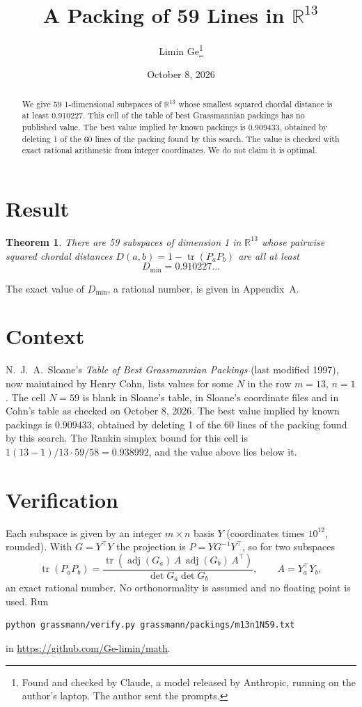 \documentclass[11pt,a4paper]{article}
\title{A Packing of 59 Lines in $\mathbb{R}^{13}$}
\author{Limin Ge\thanks{Found and checked by Claude, a model released by Anthropic, running on the author's laptop. The author sent the prompts.}}
\date{October 8, 2026}
\newtheorem*{theorem}{Theorem}
\begin{document}
\maketitle
\begin{abstract}
We give 59 1-dimensional subspaces of $\mathbb{R}^{13}$ whose smallest squared chordal distance is at least 0.910227. This cell of the table of best Grassmannian packings has no published value. The best value implied by known packings is 0.909433, obtained by deleting 1 of the 60 lines of the packing found by this search. The value is checked with exact rational arithmetic from integer coordinates. We do not claim it is optimal.
\end{abstract}

\section{Result}
\begin{theorem}
There are 59 subspaces of dimension 1 in $\mathbb{R}^{13}$ whose pairwise squared chordal distances $D(a,b) = 1 - \operatorname{tr}(P_aP_b)$ are all at least
\[ D_{\min} = 0.910227\ldots \]
\end{theorem}
The exact value of $D_{\min}$, a rational number, is given in Appendix~A.


\section{Context}
N.~J.~A.~Sloane's \emph{Table of Best Grassmannian Packings} (last modified 1997), now maintained by Henry Cohn, lists values for some $N$ in the row $m=13$, $n=1$. The cell $N=59$ is blank in Sloane's table, in Sloane's coordinate files and in Cohn's table as checked on October 8, 2026. The best value implied by known packings is 0.909433, obtained by deleting 1 of the 60 lines of the packing found by this search. The Rankin simplex bound for this cell is $1(13-1)/13\cdot 59/58 = 0.938992$, and the value above lies below it.


\section{Verification}
Each subspace is given by an integer $m\times n$ basis $Y$ (coordinates times $10^{12}$, rounded). With $G=Y^\top Y$ the projection is $P=YG^{-1}Y^\top$, so for two subspaces
\[ \operatorname{tr}(P_aP_b)=\frac{\operatorname{tr}(\operatorname{adj}(G_a)\,A\,\operatorname{adj}(G_b)\,A^\top)}{\det G_a\det G_b},\qquad A=Y_a^\top Y_b, \]
an exact rational number. No orthonormality is assumed and no floating point is used. Run
\begin{verbatim}
python grassmann/verify.py grassmann/packings/m13n1N59.txt
\end{verbatim}
in \url{https://github.com/Ge-limin/math}.
\end{document}
